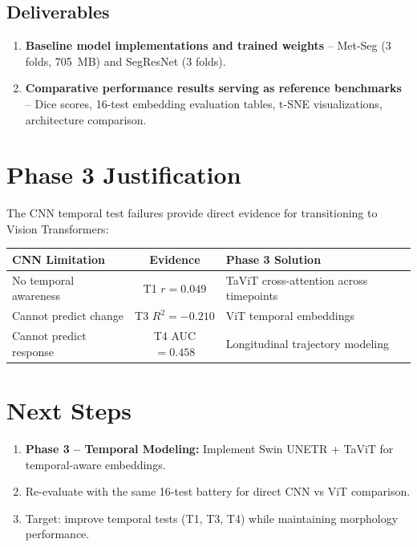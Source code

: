 \documentclass[10pt,a4paper]{article}
\begin{document}
\subsection*{Deliverables}
\begin{enumerate}[nosep, leftmargin=1.5em]
    \item \textbf{Baseline model implementations and trained weights} -- Met-Seg (3 folds, 705~MB) and SegResNet (3 folds).
    \item \textbf{Comparative performance results serving as reference benchmarks} -- Dice scores, 16-test embedding evaluation tables, t-SNE visualizations, architecture comparison.
\end{enumerate}

\section{Phase 3 Justification}

The CNN temporal test failures provide direct evidence for transitioning to Vision Transformers:

\begin{center}
\begin{tabular}{>{\raggedright}p{3.5cm}cp{5.5cm}}
\toprule
\textbf{CNN Limitation} & \textbf{Evidence} & \textbf{Phase 3 Solution} \\
\midrule
No temporal awareness & T1 $r=0.049$ & TaViT cross-attention across timepoints \\
Cannot predict change & T3 $R^2=-0.210$ & ViT temporal embeddings \\
Cannot predict response & T4 AUC$=0.458$ & Longitudinal trajectory modeling \\
\bottomrule
\end{tabular}
\end{center}

\section{Next Steps}

\begin{enumerate}[nosep, leftmargin=1.5em]
    \item \textbf{Phase 3 -- Temporal Modeling:} Implement Swin UNETR + TaViT for temporal-aware embeddings.
    \item Re-evaluate with the same 16-test battery for direct CNN vs ViT comparison.
    \item Target: improve temporal tests (T1, T3, T4) while maintaining morphology performance.
\end{enumerate}
\end{document}
